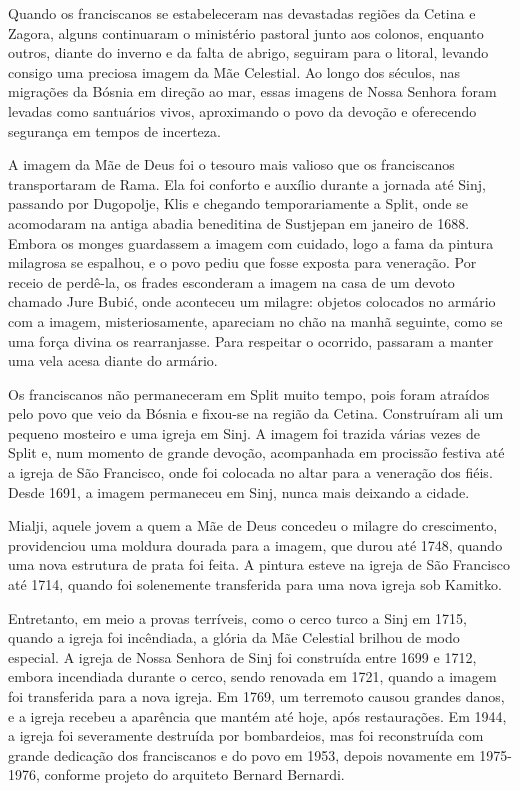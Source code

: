 \documentclass[a4paper,14pt]{extarticle} \usepackage[utf8]{inputenc}
\begin{document}
Quando os franciscanos se estabeleceram nas devastadas regiões da Cetina e Zagora, alguns continuaram o ministério pastoral junto aos colonos, enquanto outros, diante do inverno e da falta de abrigo, seguiram para o litoral, levando consigo uma preciosa imagem da Mãe Celestial. Ao longo dos séculos, nas migrações da Bósnia em direção ao mar, essas imagens de Nossa Senhora foram levadas como santuários vivos, aproximando o povo da devoção e oferecendo segurança em tempos de incerteza.

A imagem da Mãe de Deus foi o tesouro mais valioso que os franciscanos transportaram de Rama. Ela foi conforto e auxílio durante a jornada até Sinj, passando por Dugopolje, Klis e chegando temporariamente a Split, onde se acomodaram na antiga abadia beneditina de Sustjepan em janeiro de 1688. Embora os monges guardassem a imagem com cuidado, logo a fama da pintura milagrosa se espalhou, e o povo pediu que fosse exposta para veneração. Por receio de perdê-la, os frades esconderam a imagem na casa de um devoto chamado Jure Bubić, onde aconteceu um milagre: objetos colocados no armário com a imagem, misteriosamente, apareciam no chão na manhã seguinte, como se uma força divina os rearranjasse. Para respeitar o ocorrido, passaram a manter uma vela acesa diante do armário.

Os franciscanos não permaneceram em Split muito tempo, pois foram atraídos pelo povo que veio da Bósnia e fixou-se na região da Cetina. Construíram ali um pequeno mosteiro e uma igreja em Sinj. A imagem foi trazida várias vezes de Split e, num momento de grande devoção, acompanhada em procissão festiva até a igreja de São Francisco, onde foi colocada no altar para a veneração dos fiéis. Desde 1691, a imagem permaneceu em Sinj, nunca mais deixando a cidade.

Mialji, aquele jovem a quem a Mãe de Deus concedeu o milagre do crescimento, providenciou uma moldura dourada para a imagem, que durou até 1748, quando uma nova estrutura de prata foi feita. A pintura esteve na igreja de São Francisco até 1714, quando foi solenemente transferida para uma nova igreja sob Kamitko.

Entretanto, em meio a provas terríveis, como o cerco turco a Sinj em 1715, quando a igreja foi incêndiada, a glória da Mãe Celestial brilhou de modo especial. A igreja de Nossa Senhora de Sinj foi construída entre 1699 e 1712, embora incendiada durante o cerco, sendo renovada em 1721, quando a imagem foi transferida para a nova igreja. Em 1769, um terremoto causou grandes danos, e a igreja recebeu a aparência que mantém até hoje, após restaurações. Em 1944, a igreja foi severamente destruída por bombardeios, mas foi reconstruída com grande dedicação dos franciscanos e do povo em 1953, depois novamente em 1975-1976, conforme projeto do arquiteto Bernard Bernardi.
\end{document}
